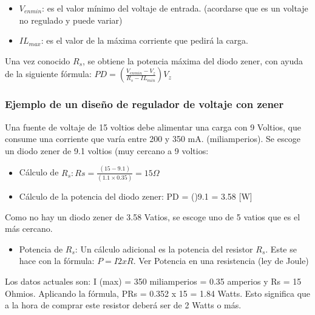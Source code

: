\documentclass{article}
\begin{document}
\begin{itemize}
    \item     $V_{enmin}$: es el valor mínimo del voltaje de entrada. (acordarse que es un voltaje no regulado y puede variar)
    \item $IL _{max}$: es el valor de la máxima corriente que pedirá la carga.
\end{itemize}

Una vez conocido $R_s$, se obtiene la potencia máxima del diodo zener, con ayuda de la siguiente fórmula: $PD = (\frac{V_{enmin}-V_z}{R_s-IL_{min}})V_z$ \citep{regZener}\\


\subsubsection{Ejemplo de un diseño de regulador de voltaje con zener}

Una fuente de voltaje de 15 voltios debe alimentar una carga con 9 Voltios, que consume una corriente que varía entre 200 y 350 mA. (miliamperios). Se escoge un diodo zener de 9.1 voltios (muy cercano a 9 voltios:\\

\begin{itemize}
    \item Cálculo de $R_s: Rs =\frac{(15-9.1)}{(1.1×0.35)}= 15 \Omega$
\item Cálculo de la potencia del diodo zener: PD = ()9.1 = 3.58 [W]
\end{itemize}

Como no hay un diodo zener de 3.58 Vatios, se escoge uno de 5 vatios que es el más cercano.\\

\begin{itemize}
    \item Potencia de $R_s$: Un cálculo adicional es la potencia del resistor $R_s$. Este se hace con la fórmula: $P = I2 x R$. Ver Potencia en una resistencia (ley de Joule)
\end{itemize}

Los datos actuales son: I (max) = 350 miliamperios = 0.35 amperios y Rs = 15 Ohmios. Aplicando la fórmula, PRs = 0.352 x 15 = 1.84 Watts. Esto significa que a la hora de comprar este resistor deberá ser de 2 Watts o más.\citep{regZener}\\[2cm]
 
 
 





\end{document}
